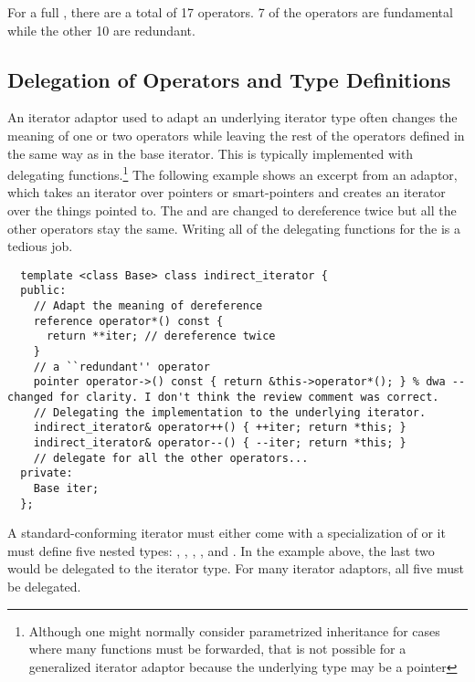 \documentclass{netobjectdays}
\begin{document}
For a full , there are a total of 17
operators. 7 of the operators are fundamental while the other 10 are
redundant.

 


\subsection{Delegation of Operators and Type Definitions}

An iterator adaptor used to adapt an underlying iterator type often
changes the meaning of one or two operators while leaving the rest of
the operators defined in the same way as in the base iterator.  This
is typically implemented with delegating functions.\footnote{Although
one might normally consider parametrized inheritance for cases where
many functions must be forwarded, that is not possible for a
generalized iterator adaptor because the underlying type may be a
pointer} The following example shows an excerpt from an
 adaptor, which takes an iterator over
pointers or smart-pointers and creates an iterator over the things
pointed to. The  and  are changed to
dereference twice but all the other operators stay the same. Writing
all of the delegating functions for the  is a
tedious job.

{\footnotesize
\begin{verbatim}
  template <class Base> class indirect_iterator {
  public:
    // Adapt the meaning of dereference
    reference operator*() const {
      return **iter; // dereference twice
    }
    // a ``redundant'' operator
    pointer operator->() const { return &this->operator*(); } % dwa -- changed for clarity. I don't think the review comment was correct.
    // Delegating the implementation to the underlying iterator.
    indirect_iterator& operator++() { ++iter; return *this; }
    indirect_iterator& operator--() { --iter; return *this; }
    // delegate for all the other operators...
  private:
    Base iter;
  };
\end{verbatim}
}

A standard-conforming iterator must either come with a specialization
of  or it must define five nested
types: , , ,
, and . In the
example above, the last two would be delegated to the 
iterator type. For many iterator adaptors, all five must be delegated.
\end{document}
